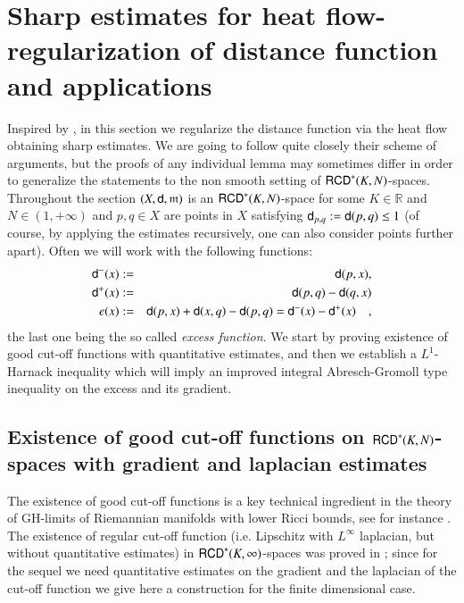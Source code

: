 \documentclass[11pt,reqno]{amsart}
\newcommand{\mm}{\mathfrak m}
\newcommand{\sfd}{{\sf d}}
\newcommand{\R}{\mathbb{R}}
\newcommand{\RCD}{{\sf RCD}}
\theoremstyle{definition}
\theoremstyle{remark}
\theoremstyle{remark}
\theoremstyle{remark}
\theoremstyle{remark}
\theoremstyle{remark}
\theoremstyle{remark}
\theoremstyle{remark}
\begin{document}
\section{Sharp estimates  for heat flow-regularization of distance function and applications}\label{S:EstHeatApprox}
Inspired by \cite{CN}, in this section we regularize the distance function via the heat flow obtaining  sharp estimates.  We are going to follow quite closely their scheme of arguments, but the proofs of any individual lemma may sometimes differ in order to generalize the statements to the non smooth setting of $\RCD^*(K,N)$-spaces. 
\\

Throughout the section $(X,\sfd,\mm)$ is an  $\RCD^*(K,N)$-space for some $K \in \R$ and $N \in (1,+\infty)$ and $p,q\in X$ are points in $X$ satisfying $\sfd_{p,q}:=\sfd(p,q)\leq 1$ (of course, by applying the estimates recursively, one can also consider points further apart). Often we will work with the following functions:
\begin{eqnarray}
\sfd^-(x)&:=&\sfd(p,x), \label{def:d-} \\
 \sfd^+(x)&:=& \sfd(p,q)-\sfd(q,x) \label{def:d+} \\
 e(x)&:=& \sfd(p,x)+\sfd(x,q)-\sfd(p,q)=\sfd^-(x)-\sfd^+(x) \quad, \label{def:exc} 
\end{eqnarray} 
the last one being the so called \emph{excess function}. We start by proving existence of good cut-off functions with quantitative estimates, and  then we establish  a $L^1$-Harnack inequality which will imply an improved integral Abresch-Gromoll type inequality on the excess and its gradient.

\subsection{Existence of good cut-off functions on $\RCD^*(K,N)$-spaces with gradient and laplacian estimates} 
The existence of  good cut-off functions is a key technical ingredient in the theory of GH-limits of Riemannian manifolds with lower Ricci bounds, see for instance \cite{CC96,CC97,CC00a,CC00b, Col96a, Col96b,  Col97, CN}. The existence  of  regular cut-off function (i.e. Lipschitz with $L^\infty$ laplacian, but without quantitative estimates)  in $\RCD^*(K,\infty)$-spaces was proved in  \cite[Lemma 6.7]{AMSLocToGlob}; since for the sequel we need quantitative estimates on the gradient and the laplacian of the cut-off function we give here a construction for the  finite dimensional case.  %
\end{document}
